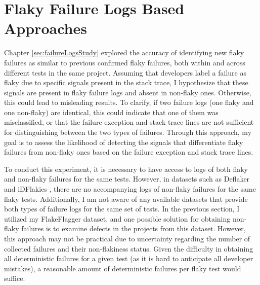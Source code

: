 
\section{Flaky Failure Logs Based Approaches}
\label{sec:failureLogsApproach}


Chapter \ref{sec:failureLogsStudy} explored the accuracy of identifying new flaky failures as similar to previous confirmed flaky failures, both within and across different tests in the same project. Assuming that developers label a failure as flaky due to specific signals present in the stack trace, I hypothesize that these signals are present in flaky failure logs and absent in non-flaky ones. Otherwise, this could lead to misleading results. To clarify, if two failure logs (one flaky and one non-flaky) are identical, this could indicate that one of them was misclassified, or that the failure exception and stack trace lines are not sufficient for distinguishing between the two types of failures. Through this approach, my goal is to assess the likelihood of detecting the signals that differentiate flaky failures from non-flaky ones based on the failure exception and stack trace lines.

To conduct this experiment, it is necessary to have access to logs of both flaky and non-flaky failures for the same tests. However, in datasets such as Deflaker \cite{bell2018deflaker} and iDFlakies \cite{lam2019idflakies}, there are no accompanying logs of non-flaky failures for the same flaky tests. Additionally, I am not aware of any available datasets that provide both types of failure logs for the same set of tests. In the previous section, I utilized my FlakeFlagger dataset, and one possible solution for obtaining non-flaky failures is to examine defects in the projects from this dataset. However, this approach may not be practical due to uncertainty regarding the number of collected failures and their non-flakiness status. Given the difficulty in obtaining all deterministic failures for a given test (as it is hard to anticipate all developer mistakes), a reasonable amount of deterministic failures per flaky test would suffice.

